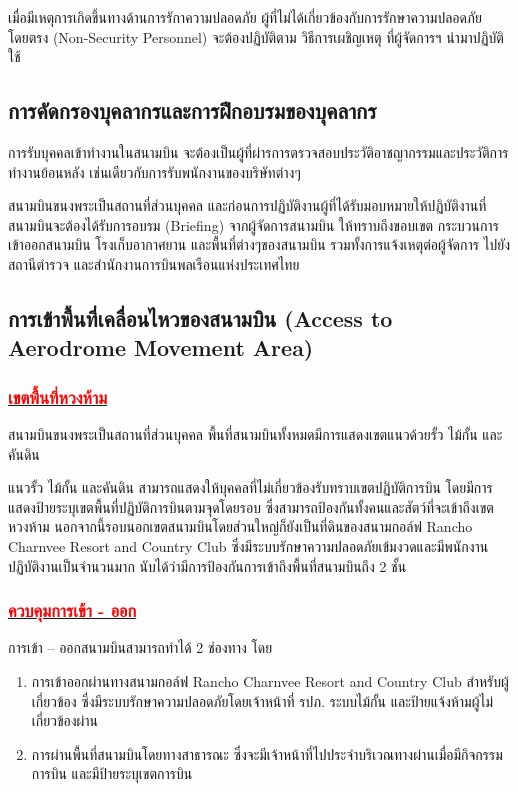 เมื่อมีเหตุการเกิดขึ้นทางด้านการรักาความปลอดภัย ผู้ที่ไม่ได้เกี่ยวข้องกับการรักษาความปลอดภัยโดยตรง (Non-Security Personnel) จะต้องปฏิบัติตาม วิธีการเผชิญเหตุ ที่ผู้จัดการฯ นำมาปฏิบัติใช้

\subsection{การคัดกรองบุคลากรและการฝึกอบรมของบุคลากร}

การรับบุคคลเข้าทำงานในสนามบิน จะต้องเป็นผู้ที่ผ่ารการตรวจสอบประวัติอาชญากรรมและประวัติการทำงานย้อนหลัง เช่นเดียวกับการรับพนักงานของบริษัทต่างๆ

สนามบินขนงพระเป็นสถานที่ส่วนบุคคล  และก่อนการปฏิบัติงานผู้ที่ได้รับมอบหมายให้ปฏิบัติงานที่สนามบินจะต้องได้รับการอบรม (Briefing) จากผู้จัดการสนามบิน ให้ทราบถึงขอบเขต กระบวนการเข้าออกสนามบิน โรงเก็บอากาศยาน และพื้นที่ต่างๆของสนามบิน รวมทั้งการแจ้งเหตุต่อผู้จัดการ ไปยังสถานีตำรวจ และสำนักงานการบินพลเรือนแห่งประเทศไทย

\subsection{การเข้าพื้นที่เคลื่อนไหวของสนามบิน (Access to Aerodrome Movement Area)}

\subsubsection{\underline{\textcolor{red}{เขตพื้นที่หวงห้าม}}}

สนามบินขนงพระเป็นสถานที่ส่วนบุคคล  พื้นที่สนามบินทั้งหมดมีการแสดงเขตแนวด้วยรั้ว ไม้กั้น และคันดิน 

แนวรั้ว ไม้กั้น และคันดิน สามารถแสดงให้บุคคลที่ไม่เกี่ยวข้องรับทราบเขตปฏิบัติการบิน โดยมีการแสดงป้ายระบุเขตพื้นที่ปฏิบัติการบินตามจุดโดยรอบ ซึ่งสามารถป้องกันทั้งคนและสัตว์ที่จะเข้าถึงเขตหวงห้าม นอกจากนี้รอบนอกเขตสนามบินโดยส่วนใหญ่ก็ยังเป็นที่ดินของสนามกอล์ฟ Rancho Charnvee Resort and Country Club ซึ่งมีระบบรักษาความปลอดภัยเข้มงวดและมีพนักงานปฏิบัติงานเป็นจำนวนมาก นับได้ว่ามีการป้องกันการเข้าถึงพื้นที่สนามบินถึง 2 ชั้น 

\subsubsection{\underline{\textcolor{red}{ควบคุมการเข้า - ออก}}}

การเข้า – ออกสนามบินสามารถทำได้ 2 ช่องทาง โดย

\begin{enumerate}
\item การเข้าออกผ่านทางสนามกอล์ฟ Rancho Charnvee Resort and Country Club สำหรับผู้เกี่ยวข้อง ซึ่งมีระบบรักษาความปลอดภัยโดยเจ้าหน้าที่ รปภ. ระบบไม้กั้น และป้ายแจ้งห้ามผู้ไม่เกี่ยวข้องผ่าน 
\item การผ่านพื้นที่สนามบินโดยทางสาธารณะ ซึ่งจะมีเจ้าหน้าที่ไปประจำบริเวณทางผ่านเมื่อมีกิจกรรมการบิน และมีป้ายระบุเขตการบิน
\end{enumerate}

